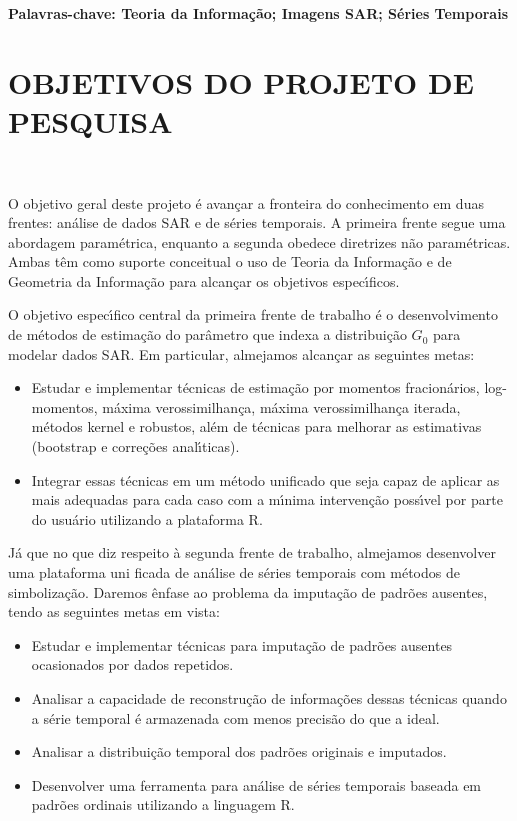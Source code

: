 \documentclass[12pt]{article}
\begin{document}
\textbf{Palavras-chave: Teoria da Informação; Imagens SAR; Séries Temporais} 


\newpage
\section*{\centering \textbf{OBJETIVOS DO PROJETO DE PESQUISA}}
\hrulefill \\

\vspace{0.5cm}

O objetivo geral deste projeto é avançar a fronteira do conhecimento em duas frentes: análise de dados SAR e de séries temporais. A primeira frente segue uma abordagem paramétrica, enquanto a segunda obedece diretrizes não paramétricas. Ambas têm como suporte conceitual o uso de Teoria da Informação e de Geometria da Informação para alcançar os objetivos especı́ficos.

O objetivo especı́fico central da primeira frente de trabalho é o desenvolvimento de métodos de estimação do parâmetro que indexa a distribuição $G_0$ para modelar dados SAR. Em particular, almejamos alcançar as seguintes metas:

\begin{itemize}
    \item  Estudar e implementar técnicas de estimação por momentos fracionários, log-momentos, máxima verossimilhança, máxima verossimilhança iterada, métodos kernel e robustos, além de técnicas para
melhorar as estimativas (bootstrap e correções analı́ticas).
    \item Integrar essas técnicas em um método unificado que seja capaz de aplicar as mais adequadas para cada caso com a mı́nima intervenção possı́vel por parte do usuário utilizando a plataforma R.
\end{itemize}
Já que no que diz respeito à segunda frente de trabalho, almejamos desenvolver uma plataforma uni ficada de análise de séries temporais com métodos de simbolização. Daremos ênfase ao problema da imputação de padrões ausentes, tendo as seguintes metas em vista:
\begin{itemize}
    \item Estudar e implementar técnicas para imputação de padrões ausentes ocasionados por dados repetidos.
    \item Analisar a capacidade de reconstrução de informações dessas técnicas quando a série temporal é armazenada com menos precisão do que a ideal.
    \item Analisar a distribuição temporal dos padrões originais e imputados.
    \item Desenvolver uma ferramenta para análise de séries temporais baseada em padrões ordinais utilizando a linguagem R.

\end{itemize}
\end{document}
